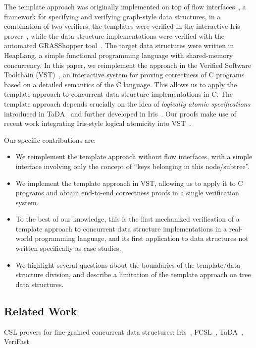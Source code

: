 \documentclass[a4paper,UKenglish,cleveref, autoref, thm-restate]{lipics-v2021}
\begin{document}

The template approach was originally implemented on top of flow interfaces~\cite{krishna2017flow}, a framework for specifying and verifying graph-style data structures, in a combination of two verifiers: the templates were verified in the interactive Iris prover~\cite{iris}, while the data structure implementations were verified with the automated GRASShopper tool~\cite{grasshopper}. The target data structures were written in HeapLang, a simple functional programming language with shared-memory concurrency. In this paper, we reimplement the approach in the Verified Software Toolchain (VST)~\cite{plcc}, an interactive system for proving correctness of C programs based on a detailed semantics of the C language. This allows us to apply the template approach to concurrent data structure implementations in C. The template approach depends crucially on the idea of \emph{logically atomic specifications} introduced in TaDA~\cite{tada} and further developed in Iris~\cite{iris}. Our proofs make use of recent work integrating Iris-style logical atomicity into VST~\cite{iris-vst-arxiv}. %

Our specific contributions are:
\begin{itemize}
\item We reimplement the template approach without flow interfaces, with a simple interface involving only the concept of ``keys belonging in this node/subtree''.
\item We implement the template approach in VST, allowing us to apply it to C programs and obtain end-to-end correctness proofs in a single verification system.
\item To the best of our knowledge, this is the first mechanized verification of a template approach to concurrent data structure implementations in a real-world programming language, and its first application to data structures not written specifically as case studies.
\item We highlight several questions about the boundaries of the template/data structure division, and describe a limitation of the template approach on tree data structures.
\end{itemize}

\subsection*{Related Work}
CSL provers for fine-grained concurrent data structures: Iris~\cite{iris,iris-folly}, FCSL~\cite{fcsl}, TaDA~\cite{tada,Xiong2017Abstract}, VeriFast~\cite{verifast,verifast-conc}
\end{document}
